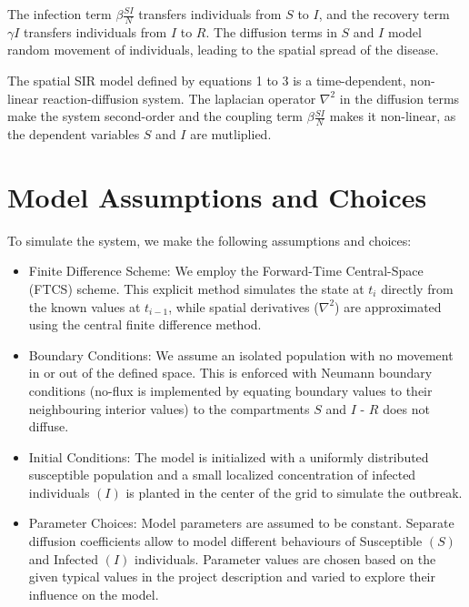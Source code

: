\documentclass[
]{article}
\providecommand{\tightlist}{%
  \setlength{\itemsep}{0pt}\setlength{\parskip}{0pt}}
\begin{document}
The infection term \(\beta \frac{SI}{N}\) transfers individuals from
\(S\) to \(I\), and the recovery term \(\gamma I\) transfers individuals
from \(I\) to \(R\). The diffusion terms in \(S\) and \(I\) model random
movement of individuals, leading to the spatial spread of the disease.

The spatial SIR model defined by equations 1 to 3 is a time-dependent,
non-linear reaction-diffusion system. The laplacian operator
\(\nabla^2\) in the diffusion terms make the system second-order and the
coupling term \(\beta \frac{SI}{N}\) makes it non-linear, as the
dependent variables \(S\) and \(I\) are mutliplied.

\section{Model Assumptions and
Choices}\label{model-assumptions-and-choices}

To simulate the system, we make the following assumptions and choices:

\begin{itemize}
\tightlist
\item
  Finite Difference Scheme: We employ the Forward-Time Central-Space
  (FTCS) scheme. This explicit method simulates the state at \(t_i\)
  directly from the known values at \(t_{i-1}\), while spatial
  derivatives (\(\nabla^2\)) are approximated using the central finite
  difference method.
\item
  Boundary Conditions: We assume an isolated population with no movement
  in or out of the defined space. This is enforced with Neumann boundary
  conditions (no-flux is implemented by equating boundary values to
  their neighbouring interior values) to the compartments \(S\) and
  \(I\) - \(R\) does not diffuse.
\item
  Initial Conditions: The model is initialized with a uniformly
  distributed susceptible population and a small localized concentration
  of infected individuals \((I)\) is planted in the center of the grid
  to simulate the outbreak.
\item
  Parameter Choices: Model parameters are assumed to be constant.
  Separate diffusion coefficients allow to model different behaviours of
  Susceptible \((S)\) and Infected \((I)\) individuals. Parameter values
  are chosen based on the given typical values in the project
  description and varied to explore their influence on the model.
\end{itemize}
\end{document}
